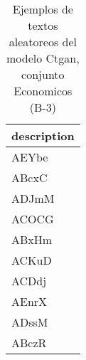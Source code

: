 \begin{table}[H]
\centering
\fontsize{8}{14}\selectfont
\caption{Ejemplos de textos aleatoreos del modelo Ctgan, conjunto Economicos (B-3)}
\label{table-sample10-economicos-b-3-ctgan-text}
\begin{tabular}{|m{50em}|}
\hline
\rowcolor[gray]{0.8}
description \\
\hline AEYbe \\
\hline ABcxC \\
\hline ADJmM \\
\hline ACOCG \\
\hline ABxHm \\
\hline ACKuD \\
\hline ACDdj \\
\hline AEnrX \\
\hline ADssM \\
\hline ABczR \\
\hline
\end{tabular}
\end{table}

